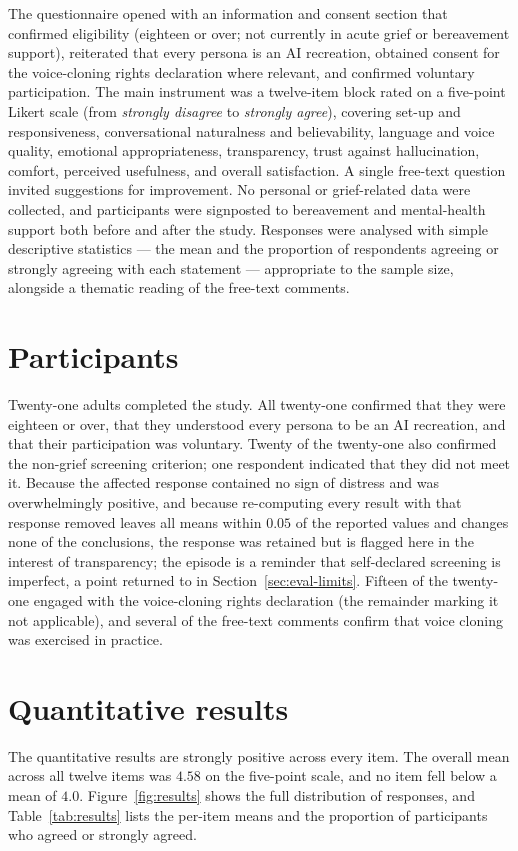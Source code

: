 \documentclass[11pt,a4paper]{report}
\begin{document}
The questionnaire opened with an information and consent section that confirmed eligibility (eighteen or over; not currently in acute grief or bereavement support), reiterated that every persona is an AI recreation, obtained consent for the voice-cloning rights declaration where relevant, and confirmed voluntary participation. The main instrument was a twelve-item block rated on a five-point Likert scale (from \emph{strongly disagree} to \emph{strongly agree}), covering set-up and responsiveness, conversational naturalness and believability, language and voice quality, emotional appropriateness, transparency, trust against hallucination, comfort, perceived usefulness, and overall satisfaction. A single free-text question invited suggestions for improvement. No personal or grief-related data were collected, and participants were signposted to bereavement and mental-health support both before and after the study. Responses were analysed with simple descriptive statistics --- the mean and the proportion of respondents agreeing or strongly agreeing with each statement --- appropriate to the sample size, alongside a thematic reading of the free-text comments.

\section{Participants}
Twenty-one adults completed the study. All twenty-one confirmed that they were eighteen or over, that they understood every persona to be an AI recreation, and that their participation was voluntary. Twenty of the twenty-one also confirmed the non-grief screening criterion; one respondent indicated that they did not meet it. Because the affected response contained no sign of distress and was overwhelmingly positive, and because re-computing every result with that response removed leaves all means within $0.05$ of the reported values and changes none of the conclusions, the response was retained but is flagged here in the interest of transparency; the episode is a reminder that self-declared screening is imperfect, a point returned to in Section~\ref{sec:eval-limits}. Fifteen of the twenty-one engaged with the voice-cloning rights declaration (the remainder marking it not applicable), and several of the free-text comments confirm that voice cloning was exercised in practice.

\section{Quantitative results}
\label{sec:eval-quant}
The quantitative results are strongly positive across every item. The overall mean across all twelve items was $4.58$ on the five-point scale, and no item fell below a mean of $4.0$. Figure~\ref{fig:results} shows the full distribution of responses, and Table~\ref{tab:results} lists the per-item means and the proportion of participants who agreed or strongly agreed.
\end{document}
